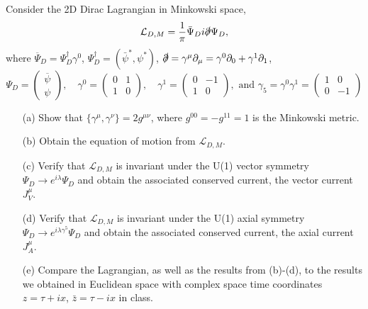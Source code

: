 	\begin{Problem} 
	Consider the 2D Dirac Lagrangian in Minkowski space,
	\[
	\mathcal{L}_{D, M} = \frac{1}{\pi} \bar{\Psi}_D i \slashed{\partial} \Psi_D,
	\]
	where $\overline{\Psi}_D = \Psi_D^\dagger \gamma^0$, $\Psi_D^\dagger = (\bar{\psi}^*, \psi^*)$, $\slashed{\partial} = \gamma^\mu \partial_\mu = \gamma^0 \partial_0 + \gamma^1 \partial_1$,
	\[
	\Psi_D = \begin{pmatrix} \overline{\psi} \\ \psi \end{pmatrix}, \quad
	\gamma^0 = \begin{pmatrix} 0 & 1 \\ 1 & 0 \end{pmatrix}, \quad
	\gamma^1 = \begin{pmatrix} 0 & -1 \\ 1 & 0 \end{pmatrix},\text{ and }\gamma_5 =\gamma^0\gamma^1 = \begin{pmatrix}  1 & 0 \\ 0 & -1 \end{pmatrix} 
	\]
	
	\begin{enumerate}
		\item[(a)] Show that $\{\gamma^\mu, \gamma^\nu\} = 2 g^{\mu\nu}$, where $g^{00} = -g^{11} = 1$ is the Minkowski metric.
		\item[(b)] Obtain the equation of motion from $\mathcal{L}_{D,M}$.
		\item[(c)] Verify that $\mathcal{L}_{D,M}$ is invariant under the U(1) vector symmetry $\Psi_D \to e^{i\lambda} \Psi_D$ and obtain the associated conserved current, the vector current $J^\mu_V$.
		\item[(d)] Verify that $\mathcal{L}_{D,M}$ is invariant under the U(1) axial symmetry $\Psi_D \to e^{i\lambda\gamma^5} \Psi_D$ and obtain the associated conserved current, the axial current $J^\mu_A$.
		\item[(e)] Compare the Lagrangian, as well as the results from (b)-(d), to the results we obtained in Euclidean space with complex space time coordinates $z = \tau + ix$, $\bar{z} = \tau - ix$ in class.
	\end{enumerate}
			
\end{Problem}

